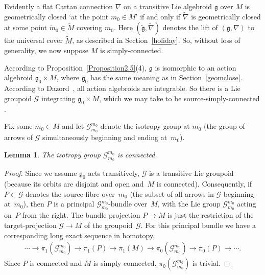 \documentclass[pdftex]{sigma}
\numberwithin{equation}{section}
\newtheorem{LemmaBlaom}[TheoremBlaom]{Lemma}
\begin{document}
Evidently a f\/lat Cartan connection $\nabla$ on a transitive Lie
algebroid $\mathfrak g$ over $M$ is geometrically closed `at the point
$m_0 \in M$' if and only if $\tilde \nabla$ is geometrically closed at
some point $\tilde m_0 \in \tilde M$ covering $m_0$. Here $(\tilde
{\mathfrak g},\tilde \nabla )$ denotes the lift of $({\mathfrak
  g},\nabla )$ to the universal cover $\tilde M$, as described in
Section~\ref{holiday}. So, without loss of generality, we now suppose $M$ is
simply-connected.

According to Proposition~\ref{Proposition2.5}(4),
  $\mathfrak g$ is
isomorphic to an action algebroid ${\mathfrak g}_0 \times M$, where
${\mathfrak g}_0$ has the same meaning as in
Section~\ref{geomclose}. According to Dazord~\cite{Dazord_97}, all action
algebroids are integrable. So there is a Lie groupoid ${\mathcal G} $
integrating $ {\mathfrak g}_0 \times M$, which we may take to be
source-simply-connected \cite[Lie~I]{Crainic_Fernandes_11}.

Fix some $m_0 \in M$ and let ${\mathcal G}_{m_0}^{m_0}$ denote the
isotropy group at $m_0$ (the group of arrows of ${\mathcal G}$
simultaneously beginning and ending at~$m_0$).

\begin{LemmaBlaom}\label{Lemma4.1}
The isotropy group ${\mathcal G}_{m_0}^{m_0}$ is connected.
\end{LemmaBlaom}

\begin{proof}
  Since we assume ${\mathfrak g}_0$ acts transitively, ${\mathcal G} $
  is a transitive Lie groupoid (because its orbits are disjoint and
  open and~$M$ is connected). Consequently, if $P \subset {\mathcal
    G}$ denotes the source-f\/ibre over~$m_0$ (the subset of all arrows
  in ${\mathcal G} $ beginning at~$m_0$), then $P$ is a principal
  ${\mathcal G}_{m_0}^{m_0}$-bundle over~$M$, with the Lie group
  ${\mathcal G}_{m_0}^{m_0}$ acting on~$P$ from the right. The bundle
  projection $P \rightarrow M$ is just the restriction of the
  target-projection ${\mathcal G} \rightarrow M$ of the groupoid~$\mathcal G$. For this principal bundle we have a corresponding long
  exact sequence in homotopy,
  \begin{gather*}
    \cdots \rightarrow  \pi_1({\mathcal G}_{m_0}^{m_0})\rightarrow \pi_1(P)
    \rightarrow \pi_1(M) \rightarrow \pi_0 ({\mathcal
      G}_{m_0}^{m_0})\rightarrow \pi_0(P) \rightarrow \cdots  .
  \end{gather*}
  Since $P$ is connected and $M$ is simply-connected, $\pi_0({\mathcal
    G}_{m_0}^{m_0})$ is trivial.
\end{proof}
\end{document}
